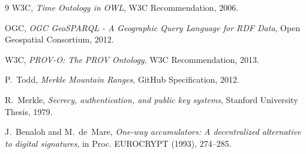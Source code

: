 \documentclass[11pt,oneside]{book}
\theoremstyle{definition}
\theoremstyle{plain}
\theoremstyle{remark}
\begin{document}
\begin{thebibliography}{9}
W3C,
\emph{Time Ontology in OWL},
W3C Recommendation, 2006. %

OGC,
\emph{OGC GeoSPARQL - A Geographic Query Language for RDF Data},
Open Geospatial Consortium, 2012. %

W3C,
\emph{PROV-O: The PROV Ontology},
W3C Recommendation, 2013. %

P.~Todd,
\emph{Merkle Mountain Ranges},
GitHub Specification, 2012. %

R.~Merkle,
\emph{Secrecy, authentication, and public key systems},
Stanford University Thesis, 1979. %

J.~Benaloh and M.~de~Mare,
\emph{One-way accumulators: A decentralized alternative to digital signatures},
in Proc. EUROCRYPT (1993), 274--285. %
\end{thebibliography}
\end{document}
